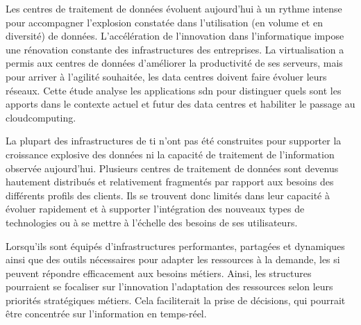 


Les centres de traitement de données évoluent aujourd'hui à un rythme intense pour accompagner l'explosion constatée dans l'utilisation (en volume et en diversité) de données. L'accélération de l'innovation dans l'informatique impose une rénovation constante des infrastructures des entreprises. La virtualisation a permis aux centres de données d'améliorer la productivité de ses serveurs, mais pour arriver à l'agilité souhaitée, les data centres doivent faire évoluer leurs réseaux.%
Cette étude analyse les applications \gls{sdn} pour distinguer quels sont les apports dans le contexte actuel et futur des data centres et habiliter le passage au \gls{cloudcomputing}.

\par 
La plupart des infrastructures de \gls{ti} n'ont pas été construites pour supporter la croissance explosive des données ni la capacité de traitement de l'information observée aujourd'hui. Plusieurs centres de traitement de données sont devenus hautement distribués et relativement fragmentés par rapport aux besoins des différents profils des clients. Ils se trouvent donc limités dans leur capacité à évoluer rapidement et à supporter l'intégration des nouveaux types de technologies ou à se mettre à l'échelle des besoins de ses utilisateurs.

\par 
Lorsqu'ils sont équipés d'infrastructures performantes, partagées et dynamiques ainsi que des outils nécessaires pour adapter les ressources à la demande, les \gls{si} peuvent répondre efficacement aux besoins métiers. Ainsi, les structures pourraient se focaliser sur l'innovation l'adaptation des ressources selon leurs priorités stratégiques métiers. Cela faciliterait la prise de décisions, qui pourrait être concentrée sur l'information en temps-réel. \cite{hpAlcatelCreatinCloudDCchallenges}

